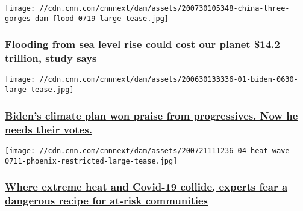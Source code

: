\href{/2020/07/30/weather/coastal-flooding-sea-level-rise-study-intl-hnk/index.html}{}

\texttt{[image: //cdn.cnn.com/cnnnext/dam/assets/200730105348-china-three-gorges-dam-flood-0719-large-tease.jpg]}

\hypertarget{flooding-from-sea-level-rise-could-cost-our-planet-142-trillion-study-says-}{%
\subsubsection{\texorpdfstring{\href{/2020/07/30/weather/coastal-flooding-sea-level-rise-study-intl-hnk/index.html}{Flooding
from sea level rise could cost our planet \$14.2 trillion, study says
}}{Flooding from sea level rise could cost our planet \$14.2 trillion, study says }}\label{flooding-from-sea-level-rise-could-cost-our-planet-142-trillion-study-says-}}

\href{/2020/07/30/politics/joe-biden-climate/index.html}{}

\texttt{[image: //cdn.cnn.com/cnnnext/dam/assets/200630133336-01-biden-0630-large-tease.jpg]}

\hypertarget{bidens-climate-plan-won-praise-from-progressives-now-he-needs-their-votes}{%
\subsubsection{\texorpdfstring{\href{/2020/07/30/politics/joe-biden-climate/index.html}{Biden's
climate plan won praise from progressives. Now he needs their
votes.}}{Biden's climate plan won praise from progressives. Now he needs their votes.}}\label{bidens-climate-plan-won-praise-from-progressives-now-he-needs-their-votes}}

\href{/2020/07/24/us/extreme-heat-coronavirus-climate-change-compounding-risks/index.html}{}

\texttt{[image: //cdn.cnn.com/cnnnext/dam/assets/200721111236-04-heat-wave-0711-phoenix-restricted-large-tease.jpg]}

\hypertarget{where-extreme-heat-and-covid-19-collide-experts-fear-a-dangerous-recipe-for-at-risk-communities}{%
\subsubsection{\texorpdfstring{\href{/2020/07/24/us/extreme-heat-coronavirus-climate-change-compounding-risks/index.html}{Where
extreme heat and Covid-19 collide, experts fear a dangerous recipe for
at-risk
communities}}{Where extreme heat and Covid-19 collide, experts fear a dangerous recipe for at-risk communities}}\label{where-extreme-heat-and-covid-19-collide-experts-fear-a-dangerous-recipe-for-at-risk-communities}}

